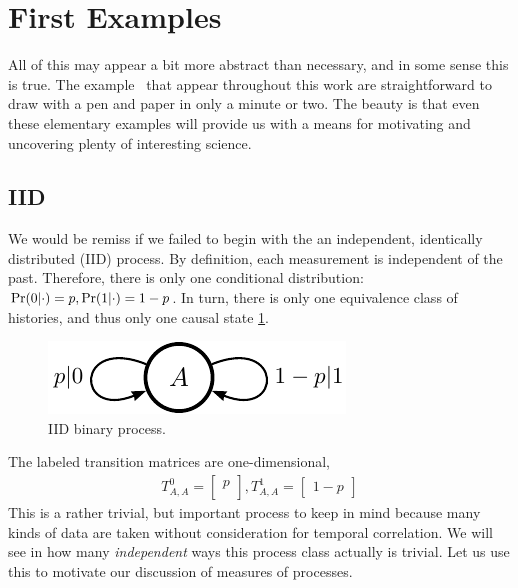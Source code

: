 \section{First Examples}
All of this may appear a bit more abstract than necessary, and in some sense this is true. The example \eMs\ that appear throughout this work are straightforward to draw with a pen and paper in only a minute or two. The beauty is that even these elementary examples will provide us with a means for motivating and uncovering plenty of interesting science.

\subsection{IID}
We would be remiss if we failed to begin with the an independent, identically distributed (IID) process. By definition, each measurement is independent of the past. Therefore, there is only one conditional distribution: $\Pr(0|\cdot) = p, \Pr(1|\cdot) = 1-p$. In turn, there is only one equivalence class of histories, and thus only one causal state \ref{fig:IID_eM}.
\begin{figure}[h!]
\begin{center}
\includegraphics[scale=1.0]{../chapter1/figures/tex/IID}
\end{center}
\caption{IID binary process.}
\label{fig:IID_eM}
\end{figure}

The labeled transition matrices are one-dimensional,
\begin{align*}
T_{A,A}^0 = \begin{bmatrix}p\\\end{bmatrix}, T_{A,A}^1 = \begin{bmatrix}1-p\end{bmatrix}
\end{align*}
This is a rather trivial, but important process to keep in mind because many kinds of data are taken without consideration for temporal correlation. We will see in how many \emph{independent} ways this process class actually is trivial. Let us use this to motivate our discussion of measures of processes.

